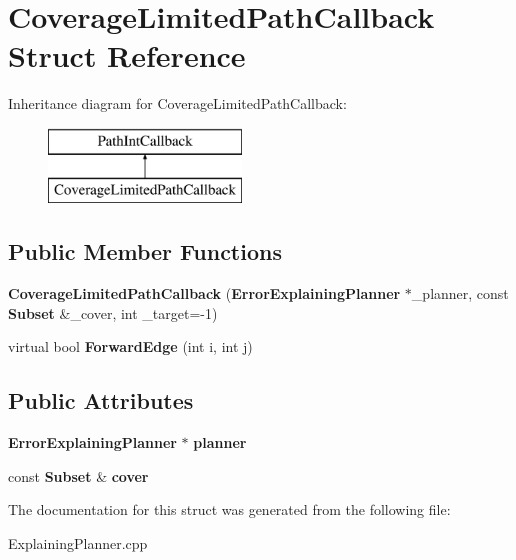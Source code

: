 \section{Coverage\+Limited\+Path\+Callback Struct Reference}
\label{structCoverageLimitedPathCallback}
Inheritance diagram for Coverage\+Limited\+Path\+Callback\+:\begin{figure}[H]
\begin{center}
\leavevmode
\includegraphics[height=2.000000cm]{structCoverageLimitedPathCallback}
\end{center}
\end{figure}
\subsection*{Public Member Functions}
\begin{DoxyCompactItemize}
\item 
{\bfseries Coverage\+Limited\+Path\+Callback} ({\bf Error\+Explaining\+Planner} $\ast$\+\_\+planner, const {\bf Subset} \&\+\_\+cover, int \+\_\+target=-\/1)\label{structCoverageLimitedPathCallback_aa05c61e1a17a148a5a1d2de16f3d79dc}

\item 
virtual bool {\bfseries Forward\+Edge} (int i, int j)\label{structCoverageLimitedPathCallback_ab60833606c22de4cd5df8fa3bf51b8e9}

\end{DoxyCompactItemize}
\subsection*{Public Attributes}
\begin{DoxyCompactItemize}
\item 
{\bf Error\+Explaining\+Planner} $\ast$ {\bfseries planner}\label{structCoverageLimitedPathCallback_adf8331c5b809401c2059b8e48ea9344a}

\item 
const {\bf Subset} \& {\bfseries cover}\label{structCoverageLimitedPathCallback_a20388649f00268a702767d9442e46e16}

\end{DoxyCompactItemize}


The documentation for this struct was generated from the following file\+:\begin{DoxyCompactItemize}
\item 
Explaining\+Planner.\+cpp\end{DoxyCompactItemize}
